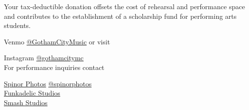 \documentclass{article}[10pt]
\begin{document}
\begin{center}
\begin{minipage}{4in}
\begin{small}
Your tax-deductible donation offsets the cost of rehearsal and performance space and contributes to the establishment of a scholarship fund for performing arts students.\\
\end{small}

Venmo \href{https://account.venmo.com/u/GothamCityMusic}{@GothamCityMusic} or visit \textbf{}

\begin{center}
{\textbf{}}

\faInstagram{}{}  Instagram  \href{https://www.instagram.com/gothamcitymc/}{@gothamcitymc}\\
For performance inquiries contact
{\textbf{}}
\end{center}

\begin{center}
{\textbf{}}

\href{https://www.spinorphotos.com/}{Spinor Photos}
    \faInstagram{}{} \href{https://www.instagram.com/spinorphotos}{@spinorphotos}\\
\href{https://www.funkadelicstudios.com/}{Funkadelic Studios}\\
\href{https://www.smashstudios.com/}{Smash Studios}
\end{center}

\end{minipage}

\end{center}
\end{document}
